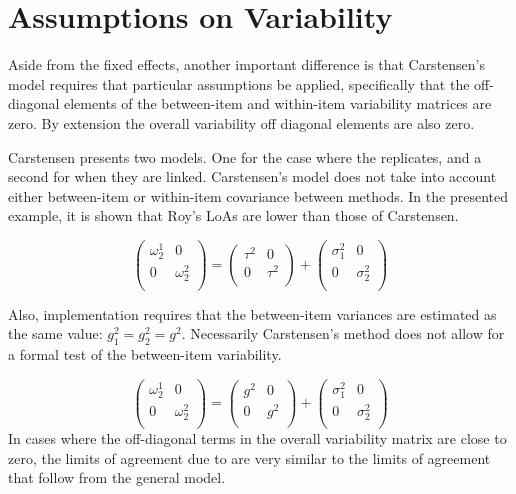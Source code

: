\documentclass[12pt, a4paper]{report}
\theoremstyle{plain}
\theoremstyle{definition}
\theoremstyle{remark}
\begin{document}
	
\section{Assumptions on Variability}
	
	Aside from the fixed effects, another important difference is that Carstensen's model requires that particular assumptions be applied, specifically that the off-diagonal elements of the between-item
	and within-item variability matrices are zero. By extension the
	overall variability off diagonal elements are also zero.

Carstensen presents two models. One for the case where the replicates, and a second for when they are linked.
Carstensen's model does not take into account either between-item or within-item covariance between methods. In the presented example, it is shown that Roy's LoAs are lower than those of Carstensen.


\[\left(\begin{array}{cc}
\omega^1_2  & 0 \\
0 & \omega^2_2 \\
\end{array}  \right)
=  \left(
\begin{array}{cc}
\tau^2  & 0 \\
0 & \tau^2 \\
\end{array} \right)+
\left(
\begin{array}{cc}
\sigma^2_1  & 0 \\
0 & \sigma^2_2 \\
\end{array}\right)
\]

	Also, implementation requires that the between-item variances are
	estimated as the same value: $g^2_1 = g^2_2 = g^2$. Necessarily
	Carstensen's method does not allow for a formal test of the
	between-item variability.
	
	\[\left(\begin{array}{cc}
	\omega^1_2  & 0 \\
	0 & \omega^2_2 \\
	\end{array}  \right)
	=  \left(
	\begin{array}{cc}
	g^2  & 0 \\
	0 & g^2 \\
	\end{array} \right)+
	\left(
	\begin{array}{cc}
	\sigma^2_1  & 0 \\
	0 & \sigma^2_2 \\
	\end{array}\right)
	\]
In cases where the off-diagonal terms in the overall variability
matrix are close to zero, the limits of agreement due to \citet{BXC2008} are very similar to the limits of agreement that follow from the general model.
	
\end{document}
